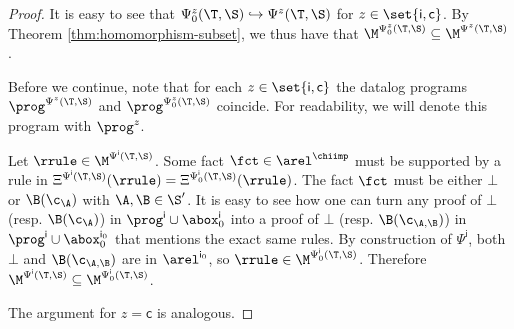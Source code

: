 \begin{proof}
It is easy to see that $\Psi^{z}_0(\T,\S) \hookrightarrow \Psi^{z}(\T,\S)$
for $z\in\set{\mathsf{i},\mathsf{c}}$. 
By Theorem \ref{thm:homomorphism-subset},
we thus have that $\M^{\Psi^{z}_0(\T,\S)} \subseteq \M^{\Psi^{z}(\T,\S)}$.

Before we continue, note that for each $z\in\set{\mathsf{i},\mathsf{c}}$ 
the datalog programs $\prog^{\Psi^{z}(\T,\S)}$ and $\prog^{\Psi^{z}_0(\T,\S)}$ coincide. For readability, 
we will denote this program with $\prog^{z}$.

Let $\rrule\in \M^{\Psi^{\mathsf{i}}(\T,\S)}$. 
Some fact $\fct\in\arel^{\chiimp}$ must be supported by a rule in 
$\Xi^{\Psi^{\mathsf{i}}(\T,\S)}(\rrule) = \Xi^{\Psi_0^{\mathsf{i}}(\T,\S)}(\rrule)$.
The fact $\fct$ must be either $\bot$ or $\B(\c_{\A})$ with $\A,\B\in\S'$.
It is easy to see how one can turn any proof of $\bot$ (resp. $\B(\c_{\A})$) in
$\prog^{\mathsf{i}}\cup\abox^{\mathsf{i}}_0$ into a proof of $\bot$ 
(resp. $\B(\c_{\A,\B})$) in $\prog^{\mathsf{i}}\cup\abox_0^{\mathsf{i}_0}$
that mentions the exact same rules.
By construction of $\Psi^{\mathsf{i}}$, both $\bot$ and $\B(\c_{\A,\B})$ are in $\arel^{\mathsf{i}_0}$,
so $\rrule\in \M^{\Psi^{\mathsf{i}}_0(\T,\S)}$. 
Therefore $\M^{\Psi^{\mathsf{i}}(\T,\S)} \subseteq \M^{\Psi^{\mathsf{i}}_0(\T,\S)}$.

The argument for $z=\mathsf{c}$ is analogous.
\end{proof}

\optimality*

